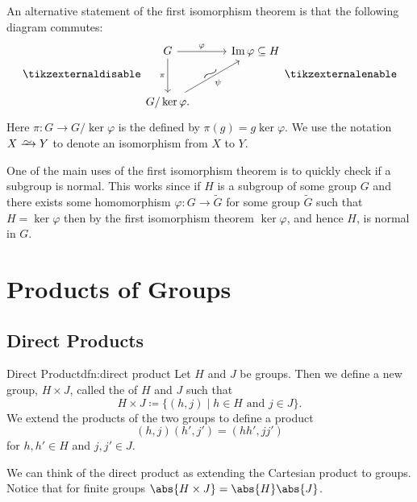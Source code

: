 An alternative statement of the first isomorphism theorem is that the following diagram commutes:
\begin{equation}
    \tikzexternaldisable
    \begin{tikzcd}[row sep=1cm, column sep=1cm]
        G \ar[r, "\varphi"]\ar[d, "\pi"'] & \image \varphi \subseteq H\\
        G/\ker\varphi. \ar[ur, "\psi"', "\longsim"{anchor=south, rotate=30, inner sep=0.1em}]
    \end{tikzcd}
    \tikzexternalenable
\end{equation}
Here \(\pi \colon G \to G/\ker\varphi\) is the  defined by \(\pi(g) = g\ker\varphi\).
We use the notation \(X \xrightarrow{\smash{\raisebox{-0.75ex}{$\sim$}}} Y\) to denote an isomorphism from \(X\) to \(Y\).

One of the main uses of the first isomorphism theorem is to quickly check if a subgroup is normal.
This works since if \(H\) is a subgroup of some group \(G\) and there exists some homomorphism \(\varphi\colon G \to \tilde{G}\) for some group \(\tilde{G}\) such that \(H = \ker\varphi\) then by the first isomorphism theorem \(\ker\varphi\), and hence \(H\), is normal in \(G\).

\chapter{Products of Groups}
\section{Direct Products}
\begin{dfn}{Direct Product}{dfn:direct product}
    Let \(H\) and \(J\) be groups.
    Then we define a new group, \(H \times J\), called the  of \(H\) and \(J\) such that
    \begin{equation}
        H \times J \coloneqq \{(h, j) \mid h \in H \text{ and } j \in J\}.
    \end{equation}
    We extend the products of the two groups to define a product
    \begin{equation}
        (h, j)(h', j') = (hh', jj')
    \end{equation}
    for \(h, h' \in H\) and \(j, j' \in J\).
\end{dfn}

We can think of the direct product as extending the Cartesian product to groups.
Notice that for finite groups \(\abs{H\times J} = \abs{H}\abs{J}\).

